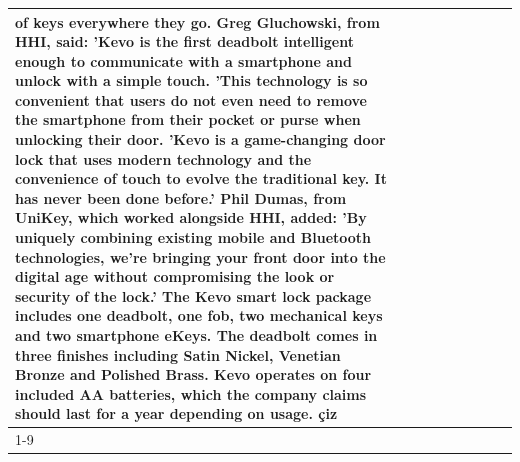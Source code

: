 \begin{table}[H]
\begin{tabular}{lllrlllll}
of keys everywhere they go. Greg Gluchowski, from HHI, said: 'Kevo is the first deadbolt intelligent enough to communicate with a smartphone and unlock with a simple touch. 'This technology is so convenient that users do not even need to remove the smartphone from their pocket or purse when unlocking their door. 'Kevo is a game-changing door lock that uses modern technology and the convenience of touch to evolve the traditional key. It has never been done before.' Phil Dumas, from UniKey, which worked alongside HHI, added: 'By uniquely combining existing mobile and Bluetooth technologies, we’re bringing your front door into the digital age without compromising the look or security of the lock.' The Kevo smart lock package includes one deadbolt, one fob, two mechanical keys and two smartphone eKeys. The deadbolt comes in three finishes including Satin Nickel, Venetian Bronze and Polished Brass. Kevo operates on four included AA batteries, which the company claims should last for a year depending on usage. çiz \\
\cline{1-9}

\end{tabular}
\end{table}
